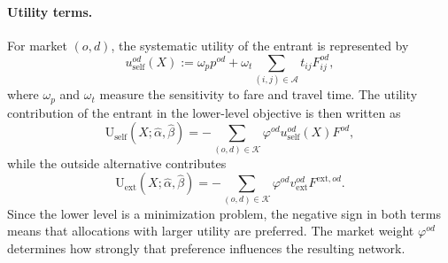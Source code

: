 \paragraph{Utility terms.}
For market $(o,d)$, the systematic utility of the entrant is represented by
\begin{equation}
u_{\mathrm{self}}^{od}(X):=
\omega_p p^{od}
+\omega_t\sum_{(i,j)\in\mathcal{A}} t_{ij}F_{ij}^{od},
\label{eq:self_utility}
\end{equation}
where $\omega_p$ and $\omega_t$ measure the sensitivity to fare and travel time. The utility contribution of the entrant in the lower-level objective is then written as
\begin{equation}
\mathrm{U}_{\mathrm{self}}(X;\widehat{\alpha},\widehat{\beta})=
-\sum_{(o,d)\in\mathcal{K}}\varphi^{od}u_{\mathrm{self}}^{od}(X)F^{od},
\label{eq:self_utility_term}
\end{equation}
while the outside alternative contributes
\begin{equation}
\mathrm{U}_{\mathrm{ext}}(X;\widehat{\alpha},\widehat{\beta})=
-\sum_{(o,d)\in\mathcal{K}}\varphi^{od}v_{\mathrm{ext}}^{od}F^{\mathrm{ext},od}.
\label{eq:ext_utility_term}
\end{equation}
Since the lower level is a minimization problem, the negative sign in both terms means that allocations with larger utility are preferred. The market weight $\varphi^{od}$ determines how strongly that preference influences the resulting network.

